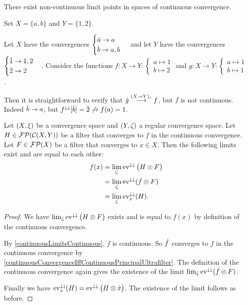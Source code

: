 \begin{example}
There exist non-continuous limit points in spaces of continuous convergence.

Set $X = \{a,b\}$ and $Y = \{1,2\}$.

Let $X$ have the convergences $\begin{cases}
\dot{a} \to a \\
\dot{b} \to a,b
\end{cases}$ and let $Y$ have the convergences $\begin{cases}
\dot{1} \to 1,2 \\
\dot{2} \to 2
\end{cases}$.
Consider the functions $f: X\to Y: \begin{cases}
a\mapsto 1 \\ b\mapsto 2
\end{cases}$ and $g: X\to Y: \begin{cases}
a\mapsto 1 \\ b\mapsto 1
\end{cases}$.

Then it is straightforward to verify that $\dot{g} \overset{(X\to Y)_c}{\longrightarrow} f$, but $f$ is not continuous. Indeed $\dot{b} \to a$, but $f^{\downarrow\downarrow}[\dot{b}] = \dot{2} \not\to f(a) = 1$.
\end{example}

\begin{proposition}
Let $\sSet{X,\xi}$ be a convergence space and $\sSet{Y,\zeta}$ a regular convergence space. Let $H\in\operatorname{\mathcal{FP}}(\operatorname{\mathcal{C}}(X,Y))$ be a filter that converges to $f$ in the continuous convergence. Let $F\in \operatorname{\mathcal{FP}}(X)$ be a filter that converges to $x\in X$. Then the following limits exist and are equal to each other:
\begin{align*}
f(x) &= \lim_\zeta \operatorname{ev}^{\downarrow\downarrow}\big(H\otimes F\big) \\
&= \lim_\zeta \operatorname{ev}^{\downarrow\downarrow}(\dot{f}\otimes F) \\
&= \lim_\zeta \operatorname{ev}_x^{\downarrow\downarrow}(H).
\end{align*}
\end{proposition}
\begin{proof}
We have $\lim_\zeta \operatorname{ev}^{\downarrow\downarrow}\big(H\otimes F\big)$ exists and is equal to $f(x)$ by definition of the continuous convergence.

By \ref{continuousLimitsContinuous}, $f$ is continuous. So $\dot{f}$ converges to $f$ in the continuous convergence by \ref{continuousConvergenceIffContinuousPrincipalUltrafilter}. The definition of the continuous convergence again gives the existence of the limit $\lim_\zeta \operatorname{ev}^{\downarrow\downarrow}(\dot{f}\otimes F)$.

Finally we have $\operatorname{ev}_x^{\downarrow\downarrow}(H) = \operatorname{ev}^{\downarrow\downarrow}\big(H\otimes \dot{x}\big)$. The existence of the limit follows as before.
\end{proof}

